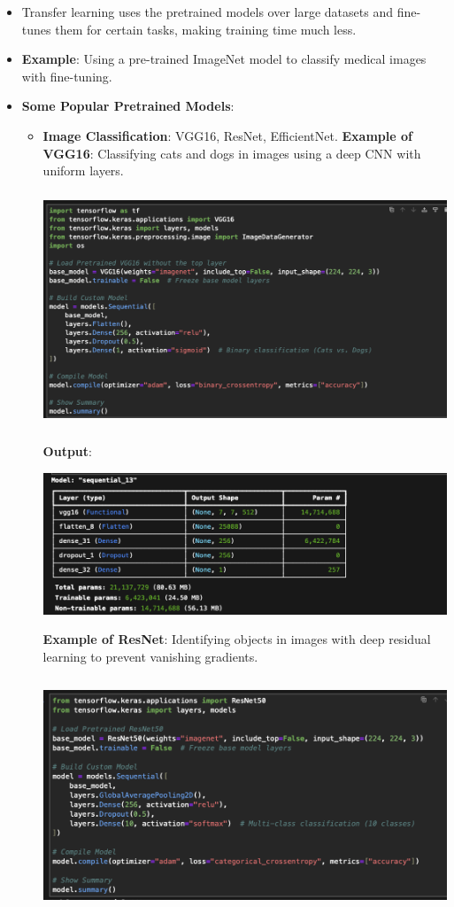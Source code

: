 \documentclass{article}
\begin{document}
\begin{itemize}
    \item Transfer learning uses the pretrained models over large datasets and fine-tunes them for certain tasks, making training time much less.
    \item \textbf{Example}: Using a pre-trained ImageNet model to classify medical images with fine-tuning.
    \item \textbf{Some Popular Pretrained Models}:
    \begin{itemize}
    \item \textbf{Image Classification}: VGG16, ResNet, EfficientNet.
    \newpage
    \textbf{Example of VGG16}: Classifying cats and dogs in images using a deep CNN with uniform layers.

    \includegraphics[width=14cm,height=7cm]{VGG16.png}


\textbf{Output}:

\includegraphics[width=14cm,height=4
cm]{VGG16_Output.png}

    \textbf{Example of ResNet}: Identifying objects in images with deep residual learning to prevent vanishing gradients.

\includegraphics[width=14cm,height=7cm]{ResNet.png}


\end{itemize}
\end{itemize}
\end{document}
